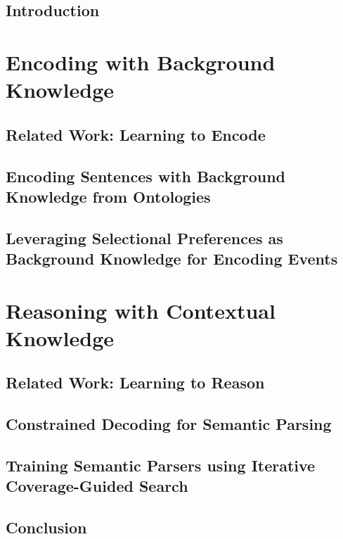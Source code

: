 \documentclass[hidelinks,12pt]{cmuthesis}
\begin{document}
\chapter{Introduction}
\label{chapter:introduction}

\part{Encoding with Background Knowledge}
\chapter{Related Work: Learning to Encode}
\label{chapter:encoding_related_work}

\chapter{Encoding Sentences with Background Knowledge from Ontologies}
\label{chapter:ontolstm}

\chapter{Leveraging Selectional Preferences as Background Knowledge for Encoding Events}
\label{chapter:nem}

\part{Reasoning with Contextual Knowledge}
\chapter{Related Work: Learning to Reason}
\label{chapter:reasoning_related_work}

\chapter{Constrained Decoding for Semantic Parsing}
\label{chapter:wikitables}

\chapter{Training Semantic Parsers using Iterative Coverage-Guided Search}
\label{chapter:nlvr}

\chapter{Conclusion}
\label{chapter:conclusion}

\end{document}
